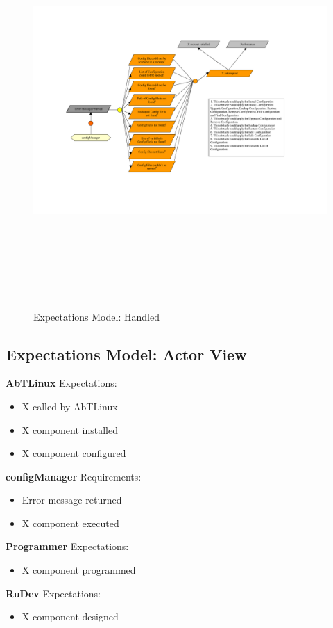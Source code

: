 \begin{figure}[htbp]
  \centering
  \includegraphics[angle=90,width=15cm,height=15cm]{"ExpectationsHandled"}
  \caption{Expectations Model: Handled}
  \label{fig:exhanmodel}
\end{figure}

\newpage
\subsection{Expectations Model: Actor View}

\textbf{AbTLinux}\newline\newline
Expectations:
\begin{itemize}
	\item X called by AbTLinux
	\item X component installed
	\item X component configured
\end{itemize}
\textbf{configManager}\newline\newline
Requirements:
\begin{itemize}
	\item Error message returned
	\item X component executed
\end{itemize}
\textbf{Programmer}\newline\newline
Expectations:
\begin{itemize}
	\item X component programmed
\end{itemize}
\textbf{RuDev}\newline\newline
Expectations:
\begin{itemize}
	\item X component designed
\end{itemize}

